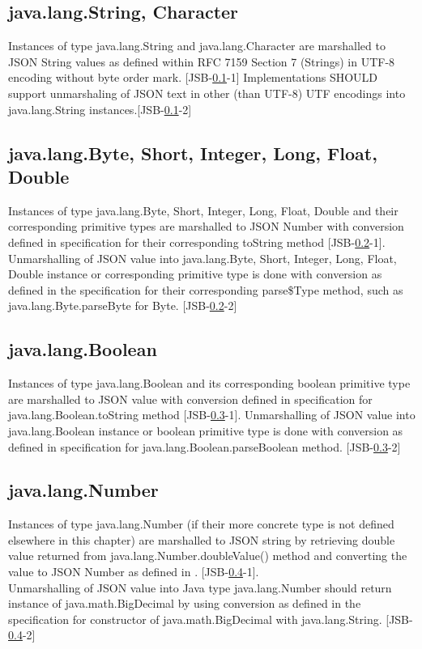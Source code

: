 \subsection{java.lang.String, Character}
\label{subsec:string}
Instances of type java.lang.String and java.lang.Character are marshalled to JSON String values as defined within RFC 7159 Section 7 (Strings) in UTF-8 encoding without byte order mark. [JSB-\ref{subsec:string}-1] Implementations SHOULD support unmarshaling of JSON text in other (than UTF-8) UTF encodings into java.lang.String instances.[JSB-\ref{subsec:string}-2]

\subsection{java.lang.Byte, Short, Integer, Long, Float, Double}
\label{subsec:number}
Instances of type java.lang.Byte, Short, Integer, Long, Float, Double and their corresponding primitive types are marshalled to JSON Number with conversion defined in specification for their corresponding toString method [JSB-\ref{subsec:number}-1]. Unmarshalling of JSON value into java.lang.Byte, Short, Integer, Long, Float, Double instance or corresponding primitive type is done with conversion as defined in the specification for their corresponding
parse\${Type} method, such as java.lang.Byte.parseByte for Byte. [JSB-\ref{subsec:number}-2]

\subsection{java.lang.Boolean}
\label{subsec:boolean}
Instances of type java.lang.Boolean and its corresponding boolean primitive type are marshalled to JSON value with conversion defined in specification for java.lang.Boolean.toString method [JSB-\ref{subsec:boolean}-1]. Unmarshalling of JSON value into java.lang.Boolean instance or boolean primitive type is done with conversion as defined in specification for java.lang.Boolean.parseBoolean method. [JSB-\ref{subsec:boolean}-2]

\subsection{java.lang.Number}
\label{subsec:abstractnumber}
Instances of type java.lang.Number (if their more concrete type is not defined elsewhere in this chapter) are marshalled to JSON string by retrieving double value returned from java.lang.Number.doubleValue() method and converting the value to JSON Number as defined in . [JSB-\ref{subsec:abstractnumber}-1].\\
Unmarshalling of JSON value into Java type java.lang.Number should return instance of java.math.BigDecimal by using conversion as defined in the specification for constructor of java.math.BigDecimal with java.lang.String. [JSB-\ref{subsec:abstractnumber}-2]


